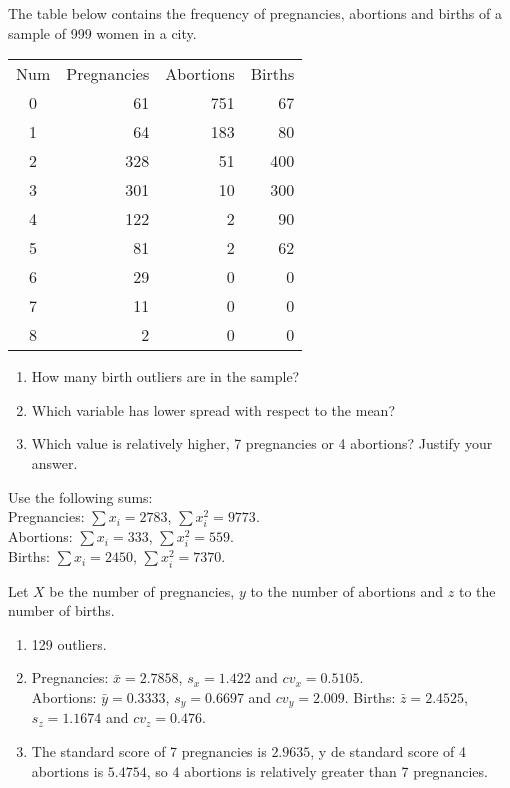 {The table below contains the frequency of pregnancies, abortions and
births of a sample of 999 women in a city.

\begin{center}
\begin{tabular}{crrr}
\toprule
Num & Pregnancies & Abortions & Births\\
0 & 61 & 751 & 67 \\
1 & 64 & 183 & 80 \\
2 & 328 & 51 & 400 \\
3 & 301 & 10 & 300 \\
4 & 122 & 2 & 90 \\
5 & 81 & 2 & 62 \\
6 & 29 & 0 & 0 \\
7 & 11 & 0 & 0 \\
8 & 2 & 0 & 0 \\
\bottomrule
\end{tabular}
\end{center}

\begin{enumerate}
\item How many birth outliers are in the sample?
\item Which variable has lower spread with respect to the mean?
\item Which value is relatively higher, 7 pregnancies or 4 abortions? Justify your answer.
\end{enumerate}

Use the following sums:\\
Pregnancies: $\sum x_i= 2783$, $\sum x_i^2=9773$.\\
Abortions: $\sum x_i= 333$, $\sum x_i^2=559$.\\
Births: $\sum x_i= 2450$, $\sum x_i^2=7370$.
}
{
Let $X$ be the number of pregnancies, $y$ to the number of abortions and $z$ to the number of births.
\begin{enumerate}
\item 129 outliers.
\item Pregnancies: $\bar{x}=2.7858$, $s_x=1.422$ and $cv_x=0.5105$.\\
Abortions: $\bar{y}=0.3333$, $s_y=0.6697$ and $cv_y=2.009$.
Births: $\bar{z}=2.4525$, $s_z=1.1674$ and $cv_z=0.476$.
\item The standard score of 7 pregnancies is $2.9635$, y de standard score of 4 abortions is $5.4754$, so 4 abortions is relatively greater than 7 pregnancies.
\end{enumerate}
}
{
}
